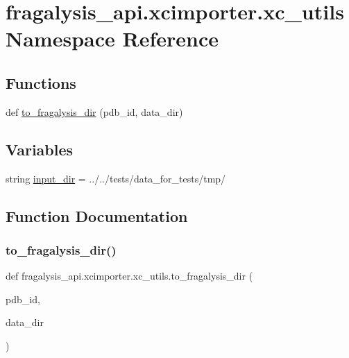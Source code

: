\hypertarget{namespacefragalysis__api_1_1xcimporter_1_1xc__utils}{}\section{fragalysis\+\_\+api.\+xcimporter.\+xc\+\_\+utils Namespace Reference}
\label{namespacefragalysis__api_1_1xcimporter_1_1xc__utils}
\subsection*{Functions}
\begin{DoxyCompactItemize}
\item 
def \hyperlink{namespacefragalysis__api_1_1xcimporter_1_1xc__utils_a20b9e349b37bfbf70c38bfaf1a42876f}{to\+\_\+fragalysis\+\_\+dir} (pdb\+\_\+id, data\+\_\+dir)
\end{DoxyCompactItemize}
\subsection*{Variables}
\begin{DoxyCompactItemize}
\item 
string \hyperlink{namespacefragalysis__api_1_1xcimporter_1_1xc__utils_a8e1ebabddefaec139b57091c2aee7c87}{input\+\_\+dir} = \textquotesingle{}../../tests/data\+\_\+for\+\_\+tests/tmp/\textquotesingle{}
\end{DoxyCompactItemize}


\subsection{Function Documentation}
\mbox{\label{namespacefragalysis__api_1_1xcimporter_1_1xc__utils_a20b9e349b37bfbf70c38bfaf1a42876f}} 
\subsubsection{\texorpdfstring{to\+\_\+fragalysis\+\_\+dir()}{to\_fragalysis\_dir()}}
{\footnotesize\ttfamily def fragalysis\+\_\+api.\+xcimporter.\+xc\+\_\+utils.\+to\+\_\+fragalysis\+\_\+dir (\begin{DoxyParamCaption}\item[{}]{pdb\+\_\+id,  }\item[{}]{data\+\_\+dir }\end{DoxyParamCaption})}

